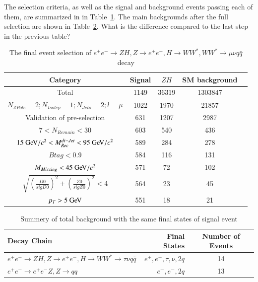 \documentclass[11pt,a4paper]{cepcnote}
\begin{document}
The selection criteria, as well as the signal and background events
passing each of them, are summarized in in Table~\ref{tab:eeuvqqCutchain}.
The main backgrounds after the full selection are shown in
Table~\ref{tab:uuuvqqbkg}. {\color{red}What is the difference compared to the last step in the previous table?}
\begin{table}[H]
  \begin{center}
    \begin{tabular}{ccccc}
      \hline \hline
      \multicolumn{1}{c}{Category} & \multicolumn{1}{c}{Signal}&\multicolumn{1}{c}{$ZH$} background&\multicolumn{1}{c}{SM background}\\ 
      \hline
      Total 	      	 									&   1149	& 36319	& 1303847\\
      $N_{ZPole}=2; N_{Isolep}=1; N_{Jets} =2; l = \mu$		&   1022	& 1970	& 21857\\
	  Validation of pre-selection					   		&   631 	& 1207	& 2987\\
	  $7 < N_{Remain} < 30$									&	603		& 540	& 436\\
	  $15\gev/c^2 < M_{Rec}^{di-Jet} < 95\gev/c^2 $			&	589		& 284	& 278\\
	  $Btag < 0.9$											&	584		& 116	& 131\\
	  $M_{Missing} < 45\gev/c^2$							&   571		& 72	& 102\\
	  $\sqrt{(\frac{D0}{sigD0})^2+(\frac{Z0}{sigZ0})^2} < 4$&	564  	& 23 	& 45\\
	  $p_T > 5\gev$											&	551		& 18	& 21	\\	
      \hline \hline
    \end{tabular}
  \caption[Monte Carlo purities in the single lepton sample]{%
    The final event selection of $e^+e^-\rightarrow ZH, Z\rightarrow e^+e^-, H\rightarrow WW^*, WW^*\rightarrow \mu\nu q\bar{q}$ decay}
  \label{tab:eeuvqqCutchain}
  \end{center}
\end{table}
\begin{table}[H]
\begin{center}
\begin{tabular}{lrc}
\hline\hline
Decay Chain	& Final States 	&	Number of Events	\\
\hline
$e^+e^-\rightarrow ZH, Z\rightarrow e^+e^-, H\rightarrow WW^*\rightarrow \tau\nu q\bar{q}$ & $e^+, e^-, \tau, \nu, 2q $	&	14\\
$e^+e^-\rightarrow e^+e^-Z, Z\rightarrow qq$ 					& $e^+, e^-, 2q$								&	13\\
\hline\hline
\end{tabular}
\caption{Summery of total background with the same final states of signal event}
\label{tab:uuuvqqbkg}
\end{center}
\end{table}
\end{document}
